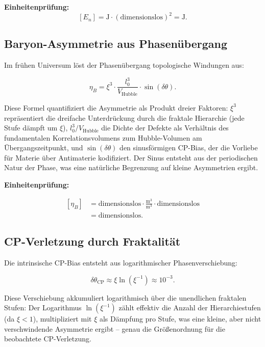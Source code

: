 	\textbf{Einheitenprüfung:}
	\[
	[E_n] = \si{\joule} \cdot (\text{dimensionslos})^2 = \si{\joule}.
	\]
	
	\subsection*{Baryon-Asymmetrie aus Phasenübergang}
	
	Im frühen Universum löst der Phasenübergang topologische Windungen aus:
	
	\begin{equation}
		\eta_B = \xi^3 \cdot \frac{l_0^3}{V_{\text{Hubble}}} \cdot \sin(\delta \theta).
	\end{equation}
	
	Diese Formel quantifiziert die Asymmetrie als Produkt dreier Faktoren: \(\xi^3\) repräsentiert die dreifache Unterdrückung durch die fraktale Hierarchie (jede Stufe dämpft um \(\xi\)), \(l_0^3 / V_{\text{Hubble}}\) die Dichte der Defekte als Verhältnis des fundamentalen Korrelationsvolumens zum Hubble-Volumen am Übergangszeitpunkt, und \(\sin(\delta \theta)\) den sinusförmigen CP-Bias, der die Vorliebe für Materie über Antimaterie kodifiziert. Der Sinus entsteht aus der periodischen Natur der Phase, was eine natürliche Begrenzung auf kleine Asymmetrien ergibt.
	
	\textbf{Einheitenprüfung:}

\[
\begin{aligned}
	[\eta_B]
	&= \text{dimensionslos}
	\cdot \frac{\si{\meter\cubed}}{\si{\meter\cubed}}
	\cdot \text{dimensionslos} \\
	&= \text{dimensionslos}.
\end{aligned}
\]
	
	\subsection*{CP-Verletzung durch Fraktalität}
	
	Die intrinsische CP-Bias entsteht aus logarithmischer Phasenverschiebung:
	
	\begin{equation}
		\delta \theta_{\text{CP}} \approx \xi \ln(\xi^{-1}) \approx 10^{-3}.
	\end{equation}
	
	Diese Verschiebung akkumuliert logarithmisch über die unendlichen fraktalen Stufen: Der Logarithmus \(\ln(\xi^{-1})\) zählt effektiv die Anzahl der Hierarchiestufen (da \(\xi < 1\)), multipliziert mit \(\xi\) als Dämpfung pro Stufe, was eine kleine, aber nicht verschwindende Asymmetrie ergibt – genau die Größenordnung für die beobachtete CP-Verletzung.
	
